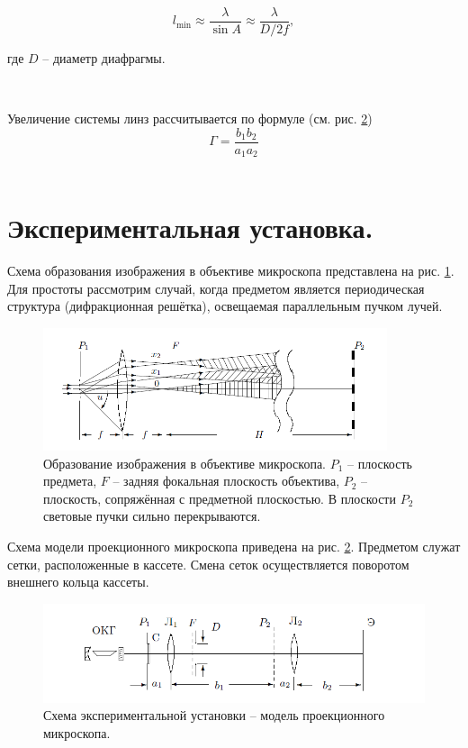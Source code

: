 \documentclass[a4paper, 12pt, twoside]{article}
\begin{document}
	\begin{equation}
	\label{f2}
	l_\text{min} \approx \dfrac{\lambda}{\sin A} \approx \dfrac{\lambda}{D/2f},
	\end{equation}
	
	где $D$ -- диаметр диафрагмы.
	
	~
	
	Увеличение системы линз рассчитывается по формуле (см. рис. \ref{scheme})
	$$ \Gamma = \dfrac{b_1b_2}{a_1a_2}$$\\
	
	
	

	\newpage
	\section{Экспериментальная установка.}
	Схема образования изображения в объективе микроскопа представлена на рис. \ref{img}. Для простоты рассмотрим случай, когда предметом является периодическая структура (дифракционная решётка), освещаемая параллельным пучком лучей.
	
	\begin{figure}[H]
		\centering
		\includegraphics[width =  0.9\textwidth]{img}
		\caption{Образование изображения в объективе микроскопа. $P_1$ -- плоскость предмета, $F$ -- задняя фокальная плоскость объектива, $P_2$ -- плоскость, сопряжённая с предметной плоскостью. В плоскости $P_2$ световые пучки сильно перекрываются.}
		\label{img}
	\end{figure}

	Схема модели проекционного микроскопа приведена на рис. \ref{scheme}. Предметом служат сетки, расположенные в кассете. Смена сеток осуществляется поворотом внешнего кольца кассеты.
	
	\begin{figure}[H]
		\centering
		\includegraphics[width =  \textwidth]{scheme}
		\caption{Схема экспериментальной установки -- модель проекционного микроскопа.}
		\label{scheme}
	\end{figure}
\end{document}
